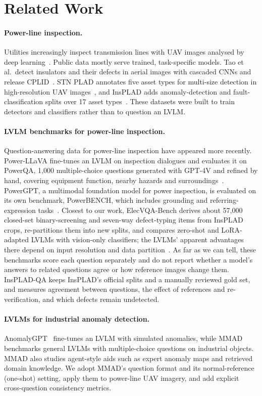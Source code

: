 \documentclass[11pt]{article}
\begin{document}
\section{Related Work}
\paragraph{Power-line inspection.} Utilities increasingly inspect transmission lines with UAV images analysed by deep learning~\cite{nguyen2018review}. Public data mostly serve trained, task-specific models. Tao et al.\ detect insulators and their defects in aerial images with cascaded CNNs and release CPLID~\cite{tao2020cplid}. STN PLAD annotates five asset types for multi-size detection in high-resolution UAV images~\cite{vieira2021stnplad}, and InsPLAD adds anomaly-detection and fault-classification splits over 17 asset types~\cite{vieira2023insplad}. These datasets were built to train detectors and classifiers rather than to question an LVLM.

\paragraph{LVLM benchmarks for power-line inspection.} Question-answering data for power-line inspection have appeared more recently. Power-LLaVA fine-tunes an LVLM on inspection dialogues and evaluates it on PowerQA, 1,000 multiple-choice questions generated with GPT-4V and refined by hand, covering equipment function, nearby hazards and surroundings~\cite{wang2024powerllava}. PowerGPT, a multimodal foundation model for power inspection, is evaluated on its own benchmark, PowerBENCH, which includes grounding and referring-expression tasks~\cite{zhong2026powergpt}. Closest to our work, ElecVQA-Bench derives about 57,000 closed-set binary-screening and seven-way defect-typing items from InsPLAD crops, re-partitions them into new splits, and compares zero-shot and LoRA-adapted LVLMs with vision-only classifiers; the LVLMs' apparent advantages there depend on input resolution and data partition~\cite{zhang2026elecvqa}. As far as we can tell, these benchmarks score each question separately and do not report whether a model's answers to related questions agree or how reference images change them. InsPLAD-QA keeps InsPLAD's official splits and a manually reviewed gold set, and measures agreement between questions, the effect of references and re-verification, and which defects remain undetected.

\paragraph{LVLMs for industrial anomaly detection.} AnomalyGPT~\cite{gu2024anomalygpt} fine-tunes an LVLM with simulated anomalies, while MMAD~\cite{jiang2025mmad} benchmarks general LVLMs with multiple-choice questions on industrial objects. MMAD also studies agent-style aids such as expert anomaly maps and retrieved domain knowledge. We adopt MMAD's question format and its normal-reference (one-shot) setting, apply them to power-line UAV imagery, and add explicit cross-question consistency metrics.
\end{document}
